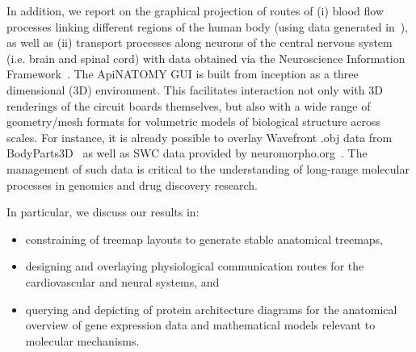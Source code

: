In addition, we report on the graphical projection of routes of (i) blood flow processes linking different regions of the human body (using data generated in~\cite{deB11}), as well as (ii) transport processes along neurons of the central nervous system (i.e. brain and spinal cord) with data obtained via the Neuroscience Information Framework~\cite{Gar+08}. The ApiNATOMY GUI is built from inception as a three dimensional (3D) environment. This facilitates interaction not only with 3D renderings of the circuit boards themselves, but also with a wide range of geometry/mesh formats for volumetric models of biological structure across scales. For instance, it is already possible to overlay Wavefront .obj data from BodyParts3D~\cite{MFT+09} as well as SWC data provided by neuromorpho.org~\cite{Asc06}. The management of such data is critical to the understanding of long-range molecular processes in genomics and drug discovery research.

In particular, we discuss our results in:
\begin{itemize}
  \item constraining of treemap layouts to generate stable anatomical treemaps,
  \item designing and overlaying physiological communication routes for the cardiovascular and neural systems, and
  \item querying and depicting of protein architecture diagrams for the anatomical overview of gene expression data and mathematical models relevant to molecular mechanisms.
\end{itemize}

